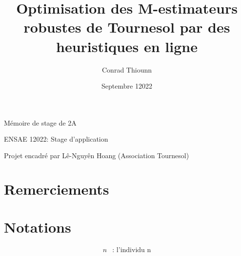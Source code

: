 \documentclass[hidelinks, 12pt]{article}
\title{Optimisation des M-estimateurs robustes de Tournesol par des heuristiques en ligne}
\author{
Conrad Thiounn }
\date{Septembre 12022}
\begin{document}
\begin{titlingpage}
\maketitle
\begin{center}
Mémoire de stage de 2A

ENSAE 12022: Stage d'application

\vspace{5mm}

Projet encadré par Lê-Nguyên Hoang (Association Tournesol)
\end{center}
\end{titlingpage}


\renewcommand*\contentsname{Table des matières}
\tableofcontents

\setlength\parskip{0.2 em} %

\pagebreak
{} %
\section*{Remerciements} 


\pagebreak

\printglossary[title=Glossaire et abréviations]

\clearpage

\pagebreak
{}
{}
\section*{Notations}

\newcommand{\si}{s_{\mathrm{image}}}
\newcommand{\li}{l_{\mathrm{image}}}

$$
\begin{aligned}
n & \text{: l'individu n} \\
\end{aligned}
$$

\pagebreak






\end{document}
